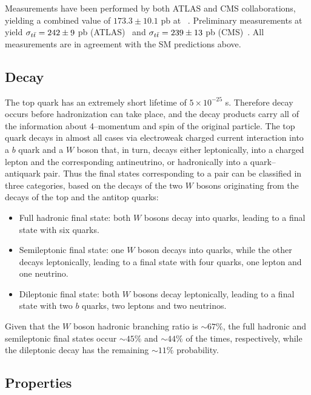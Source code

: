 Measurements have been performed by both ATLAS and CMS
collaborations, yielding a combined value of $173.3\pm10.1$ pb at
\seventev{}~\cite{ATLAS-CONF-2012-134,CMS-PAS-TOP-12-003}. Preliminary
measurements at \eighttev{} yield $\sigma_{t\bar{t}{}}=242\pm{}9$ pb
(ATLAS)~\cite{Aad:2014kva} and $\sigma_{t\bar{t}{}}=239\pm{}13$ pb
(CMS)~\cite{Chatrchyan:2013faa}. All measurements are in agreement
with the SM predictions above.

\subsection{Decay}
\label{sec:topdecay}

The top quark has an extremely short lifetime of $5\times{}10^{-25}$
s. Therefore decay occurs before hadronization can take place, and the
decay products carry all of the information about \mbox{4--momentum} and spin
of the original particle.
The top quark decays in almost all cases via electroweak
charged current interaction into a $b$ quark and a $W$ boson that,
in turn, decays either leptonically, into a charged lepton and the corresponding
antineutrino, or hadronically into a quark--antiquark pair. Thus the
final states corresponding to a \ttbar{} pair can be classified in
three categories, based on the decays of the two $W$ bosons
originating from the decays of the top and the antitop quarks:
\begin{itemize}
\item Full hadronic final state: both $W$ bosons decay into quarks,
  leading to a \ttbar{} final state with six quarks.
\item Semileptonic final state: one $W$ boson decays into quarks,
  while the other decays leptonically, leading to a final state with
  four quarks, one lepton and one neutrino.
\item Dileptonic final state: both $W$ bosons decay leptonically,
  leading to a final state with two $b$ quarks, two leptons and two
  neutrinos. 
\end{itemize}
Given that the $W$ boson hadronic branching ratio is
$\sim67\%$, the full hadronic and semileptonic final states occur
$\sim45\%$ and $\sim44\%$ of the times, respectively, while the dileptonic decay has the
remaining $\sim11\%$ probability.  

\subsection{Properties}
\label{sec:topprop}

